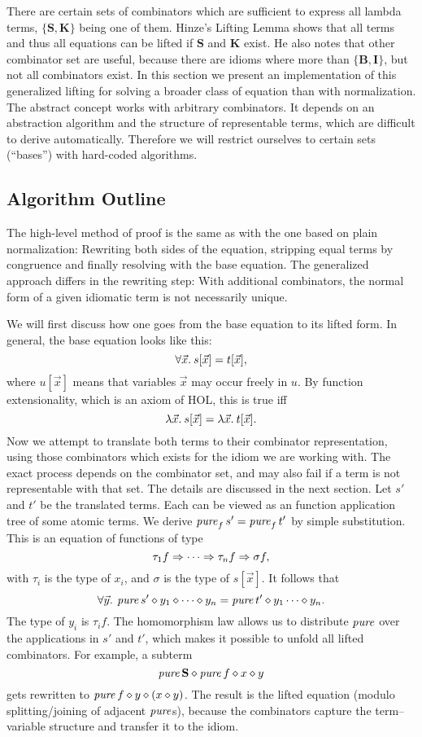 There are certain sets of combinators which are sufficient to express all
lambda terms, $\{\mathbf{S,K}\}$ being one of them.
Hinze's Lifting Lemma shows that all terms and thus all equations can be
lifted if $\mathbf{S}$ and $\mathbf{K}$ exist.
He also notes that other combinator set are useful, because there are idioms
where more than $\{\mathbf{B,I}\}$, but not all combinators exist.
In this section we present an implementation of this generalized lifting
for solving a broader class of equation than with normalization.
The abstract concept works with arbitrary combinators.
It depends on an abstraction algorithm and the structure of representable terms,
which are difficult to derive automatically.  %
Therefore we will restrict ourselves to certain sets (``bases'') with
hard-coded algorithms.

\subsection{Algorithm Outline}\label{subsec:general-algorithm}

The high-level method of proof is the same as with the one based on plain
normalization: Rewriting both sides of the equation, stripping equal terms by
congruence and finally resolving with the base equation.
The generalized approach differs in the rewriting step:
With additional combinators, the normal form of a given idiomatic term is not
necessarily unique.

We will first discuss how one goes from the base equation to its lifted form.
In general, the base equation looks like this:
\[ \forall \vec x.\>s[\vec x] = t[\vec x], \]
where $u[\vec x]$ means that variables $\vec x$ may occur freely in $u$.
By function extensionality, which is an axiom of HOL, this is true iff
\[ \lambda \vec x.\>s[\vec x] = \lambda \vec x.\>t[\vec x]. \]
Now we attempt to translate both terms to their combinator representation,
using those combinators which exists for the idiom we are working with.
The exact process depends on the combinator set, and may also fail if a term
is not representable with that set.
The details are discussed in the next section.
Let $s'$ and $t'$ be the translated terms.
Each can be viewed as an function application tree of some atomic terms.
We derive $\operatorname{\mathit{pure}}_f s' = \operatorname{\mathit{pure}}_f t'$ by simple substitution.
This is an equation of functions of type
\[ \tau_1 f \Rightarrow \cdots \Rightarrow \tau_n f \Rightarrow \sigma f, \]
with $\tau_i$ is the type of $x_i$, and $\sigma$ is the type of $s[\vec x]$.
It follows that
\[ \forall \vec y.\>\operatorname{\mathit{pure}} s' \diamond y_1 \diamond \cdots \diamond y_n =
	\operatorname{\mathit{pure}} t' \diamond y_1 \cdots \diamond y_n. \]
The type of $y_i$ is $\tau_i f$.
The homomorphism law allows us to distribute $\operatorname{\mathit{pure}}$ over the applications
in $s'$ and $t'$, which makes it possible to unfold all lifted combinators.
For example, a subterm
\[ \operatorname{\mathit{pure}} \mathbf{S} \diamond \operatorname{\mathit{pure}} f \diamond x \diamond y \]
gets rewritten to $\operatorname{\mathit{pure}} f \diamond y \diamond (x \diamond y)$.
The result is the lifted equation (modulo splitting/joining of adjacent
$\operatorname{\mathit{pure}}$s), because the combinators capture the term--variable structure and
transfer it to the idiom.

